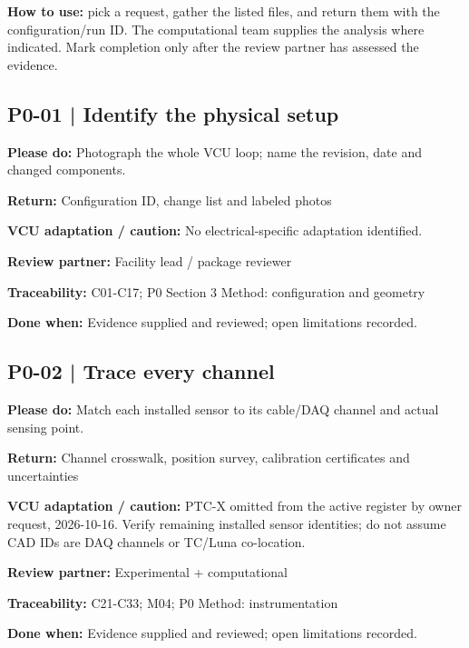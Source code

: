 \documentclass[11pt]{article}
\begin{document}
\textbf{How to use:} pick a request, gather the listed files, and return them with the configuration/run ID. The computational team supplies the analysis where indicated. Mark completion only after the review partner has assessed the evidence.
\par\noindent\begin{minipage}{\textwidth}\small\setlength{\parskip}{2pt}
\subsection*{P0-01 | Identify the physical setup}
\textbf{Please do:} Photograph the whole VCU loop; name the revision, date and changed components.\par
\textbf{Return:} Configuration ID, change list and labeled photos\par
\textbf{VCU adaptation / caution:} No electrical-specific adaptation identified.\par
\textbf{Review partner:} Facility lead / package reviewer\par
\textbf{Traceability:} C01-C17; P0 Section 3 Method: configuration and geometry\par
\textbf{Done when:} Evidence supplied and reviewed; open limitations recorded.\par
\end{minipage}\par\vspace{8pt}
\par\noindent\begin{minipage}{\textwidth}\small\setlength{\parskip}{2pt}
\subsection*{P0-02 | Trace every channel}
\textbf{Please do:} Match each installed sensor to its cable/DAQ channel and actual sensing point.\par
\textbf{Return:} Channel crosswalk, position survey, calibration certificates and uncertainties\par
\textbf{VCU adaptation / caution:} PTC-X omitted from the active register by owner request, 2026-10-16. Verify remaining installed sensor identities; do not assume CAD IDs are DAQ channels or TC/Luna co-location.\par
\textbf{Review partner:} Experimental + computational\par
\textbf{Traceability:} C21-C33; M04; P0 Method: instrumentation\par
\textbf{Done when:} Evidence supplied and reviewed; open limitations recorded.\par
\end{minipage}\par\vspace{8pt}
\end{document}
